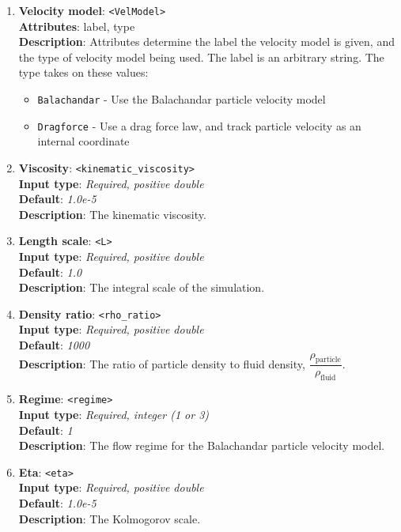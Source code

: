 \begin{enumerate}
%
\item {\bf Velocity model}: \verb=<VelModel>= \\
{\bf Attributes}: label, type \\
{\bf Description}: Attributes determine the label the velocity model is given, and the type of velocity model being used.  The label is an arbitrary string.  The type takes on these values:
\begin{itemize}
\item \verb=Balachandar= - Use the Balachandar particle velocity model
\item \verb=Dragforce= - Use a drag force law, and track particle velocity as an internal coordinate
\end{itemize}
%
\item {\bf Viscosity}: \verb=<kinematic_viscosity>= \\
{\bf Input type}: {\it Required, positive double} \\
{\bf Default}: {\it 1.0e-5} \\
{\bf Description}: The kinematic viscosity.
%
\item {\bf Length scale}: \verb=<L>= \\
{\bf Input type}: {\it Required, positive double} \\
{\bf Default}: {\it 1.0} \\
{\bf Description}: The integral scale of the simulation.
%
\item {\bf Density ratio}: \verb=<rho_ratio>= \\
{\bf Input type}: {\it Required, positive double} \\
{\bf Default}: {\it 1000} \\
{\bf Description}: The ratio of particle density to fluid density, $\dfrac{ \rho_{\text{particle}} }{ \rho_{\text{fluid}} }$.
%
\item {\bf Regime}: \verb=<regime>= \\
{\bf Input type}: {\it Required, integer (1 or 3)} \\
{\bf Default}: {\it 1} \\
{\bf Description}: The flow regime for the Balachandar particle velocity model.
%
\item {\bf Eta}: \verb=<eta>= \\
{\bf Input type}: {\it Required, positive double} \\
{\bf Default}: {\it 1.0e-5} \\
{\bf Description}: The Kolmogorov scale.
%

\end{enumerate}
